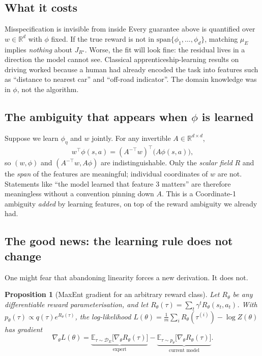 \documentclass[11pt]{article}
\theoremstyle{plain}
\newtheorem{proposition}[theorem]{Proposition}
\theoremstyle{definition}
\theoremstyle{remark}
\newcommand{\E}{\mathbb{E}}
\newcommand{\R}{\mathbb{R}}
\begin{document}
\subsection{What it costs}

\begin{redbox}{Misspecification is invisible from inside}
Every guarantee above is quantified over $w\in\R^d$ with $\phi$ fixed. If
the true reward is not in $\mathrm{span}\{\phi_1,\ldots,\phi_d\}$,
matching $\mu_E$ implies \emph{nothing} about $J_{R^\star}$. Worse, the fit
will look fine: the residual lives in a direction the model cannot see.
Classical apprenticeship-learning results on driving worked because a
human had already encoded the task into features such as ``distance to
nearest car'' and ``off-road indicator''. The domain knowledge was in
$\phi$, not the algorithm.
\end{redbox}

\subsection{The ambiguity that appears when $\phi$ is learned}

Suppose we learn $\phi_\eta$ and $w$ jointly. For any invertible $A\in
\R^{d\times d}$,
\begin{equation}
w^\top\phi(s,a) = (A^{-\top}w)^\top\big(A\phi(s,a)\big),
\label{eq:featureambiguity}
\end{equation}
so $(w,\phi)$ and $(A^{-\top}w, A\phi)$ are indistinguishable. Only the
\emph{scalar field} $R$ and the \emph{span} of the features are
meaningful; individual coordinates of $w$ are not. Statements like ``the
model learned that feature 3 matters'' are therefore meaningless without a
convention pinning down $A$. This is a Coordinate-1 ambiguity \emph{added}
by learning features, on top of the reward ambiguity we already had.

\subsection{The good news: the learning rule does not change}

One might fear that abandoning linearity forces a new derivation. It does
not.

\begin{proposition}[MaxEnt gradient for an arbitrary reward
class]\label{prop:generalgrad}
Let $R_\theta$ be any differentiable reward parameterisation, and let
$R_\theta(\tau) = \sum_t \gamma^t R_\theta(s_t,a_t)$. With $p_\theta(\tau)
\propto q(\tau)e^{R_\theta(\tau)}$, the log-likelihood $L(\theta) =
\frac1m\sum_i R_\theta(\tau^{(i)}) - \log Z(\theta)$ has gradient
\begin{equation}
\nabla_\theta L(\theta) = \underbrace{\E_{\tau\sim\mathcal{D}_E}\big[\nabla_\theta
R_\theta(\tau)\big]}_{\text{expert}} - \underbrace{\E_{\tau\sim
p_\theta}\big[\nabla_\theta R_\theta(\tau)\big]}_{\text{current model}}.
\label{eq:generalgrad}
\end{equation}
\end{proposition}
\end{document}
